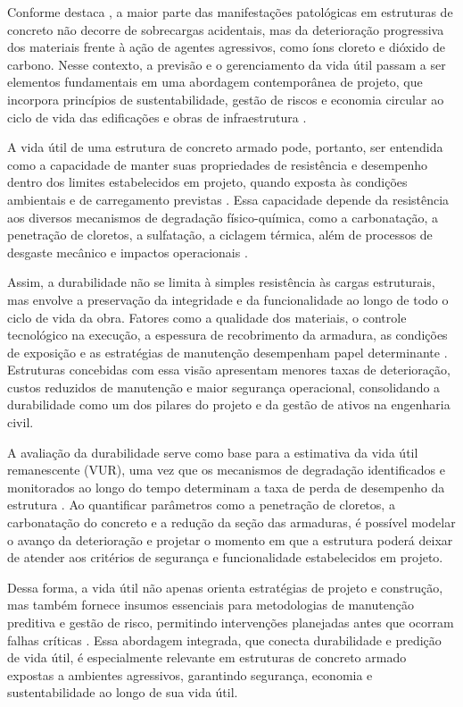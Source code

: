 Conforme destaca \textcite{mehta_concrete_2014}, a maior parte das manifestações patológicas em estruturas de concreto não decorre de sobrecargas acidentais, mas da deterioração progressiva dos materiais frente à ação de agentes agressivos, como íons cloreto e dióxido de carbono. Nesse contexto, a previsão e o gerenciamento da vida útil passam a ser elementos fundamentais em uma abordagem contemporânea de projeto, que incorpora princípios de sustentabilidade, gestão de riscos e economia circular ao ciclo de vida das edificações e obras de infraestrutura \cite{tuutti_corrosion_1982}.

A vida útil de uma estrutura de concreto armado pode, portanto, ser entendida como a capacidade de manter suas propriedades de resistência e desempenho dentro dos limites estabelecidos em projeto, quando exposta às condições ambientais e de carregamento previstas \cite{mehta_concrete_2014, helene_p_r_l_concreto_1993}. Essa capacidade depende da resistência aos diversos mecanismos de degradação físico-química, como a carbonatação, a penetração de cloretos, a sulfatação, a ciclagem térmica, além de processos de desgaste mecânico e impactos operacionais \cite{neville_properties_2011}.

Assim, a durabilidade não se limita à simples resistência às cargas estruturais, mas envolve a preservação da integridade e da funcionalidade ao longo de todo o ciclo de vida da obra. Fatores como a qualidade dos materiais, o controle tecnológico na execução, a espessura de recobrimento da armadura, as condições de exposição e as estratégias de manutenção desempenham papel determinante \cite{bertolini_corrosion_2013}. Estruturas concebidas com essa visão apresentam menores taxas de deterioração, custos reduzidos de manutenção e maior segurança operacional, consolidando a durabilidade como um dos pilares do projeto e da gestão de ativos na engenharia civil.

A avaliação da durabilidade serve como base para a estimativa da vida útil remanescente (VUR), uma vez que os mecanismos de degradação identificados e monitorados ao longo do tempo determinam a taxa de perda de desempenho da estrutura \cite{feng_prediction_2025, ortega_assessment_2016}. Ao quantificar parâmetros como a penetração de cloretos, a carbonatação do concreto e a redução da seção das armaduras, é possível modelar o avanço da deterioração e projetar o momento em que a estrutura poderá deixar de atender aos critérios de segurança e funcionalidade estabelecidos em projeto. 

Dessa forma, a vida útil não apenas orienta estratégias de projeto e construção, mas também fornece insumos essenciais para metodologias de manutenção preditiva e gestão de risco, permitindo intervenções planejadas antes que ocorram falhas críticas \cite{bertolini_corrosion_2013, stefanoni_corrosion_2018}. Essa abordagem integrada, que conecta durabilidade e predição de vida útil, é especialmente relevante em estruturas de concreto armado expostas a ambientes agressivos, garantindo segurança, economia e sustentabilidade ao longo de sua vida útil.

